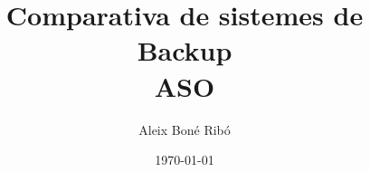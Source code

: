 



\title{Comparativa de sistemes de Backup \\ \Large \normalfont ASO}
\author{Aleix Bon\'e Rib\'o}
\date{\today}




    



    \tableofcontents



    \setlength{\parskip}{1em plus 0.5em minus 0.2em}

    
    
    
    
    


    \printbibliography[heading=bibintoc]



